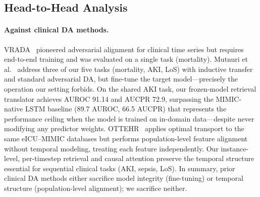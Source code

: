 \subsection{Head-to-Head Analysis}
\label{sec:head_to_head}

\paragraph{Against clinical DA methods.}
VRADA~\cite{purushotham2017vrada} pioneered adversarial alignment for clinical
time series but requires end-to-end training and was evaluated on a single task
(mortality).
Mutnuri et al.~\cite{mutnuri2024} address three of our five tasks (mortality,
AKI, LoS) with inductive transfer and standard adversarial DA, but fine-tune the
target model---precisely the operation our setting forbids.
On the shared AKI task, our frozen-model retrieval translator achieves
AUROC 91.14 and AUCPR 72.9, surpassing the MIMIC-native LSTM baseline (89.7 AUROC, 66.5 AUCPR) that represents
the performance ceiling when the model is trained on in-domain data---despite never modifying any predictor weights.
OTTEHR~\cite{ottehr2025} applies optimal transport to the same eICU--MIMIC
databases but performs population-level feature alignment without temporal
modeling, treating each feature independently.
Our instance-level, per-timestep retrieval and causal attention preserve the
temporal structure essential for sequential clinical tasks (AKI, sepsis, LoS).
In summary, prior clinical DA methods either sacrifice model integrity
(fine-tuning) or temporal structure (population-level alignment); we sacrifice
neither.

